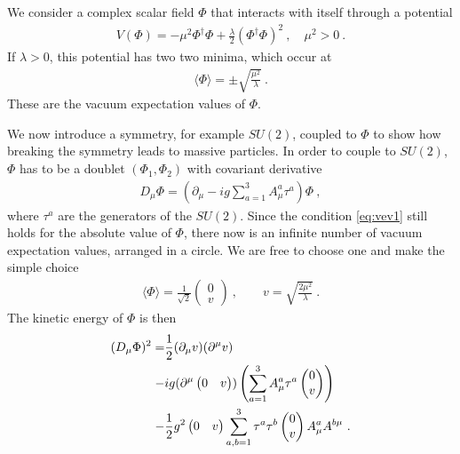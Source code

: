 We consider a complex scalar field $\Phi$ that interacts with itself through a potential
\begin{align}
	V(\Phi) = -\mu^2\Phi^\dagger\Phi + \frac{\lambda}{2}(\Phi^\dagger\Phi)^2 \ , \quad \mu^2 > 0 \ .
\end{align}
If $\lambda>0$, this potential has two two minima, which occur at
\begin{align}\label{eq:vev1}
	\langle\Phi\rangle =  \pm\sqrt{\frac{\mu^2}{\lambda}} \ .
\end{align}
These are the vacuum expectation values of $\Phi$.

We now introduce a symmetry, for example $SU(2)$, coupled to $\Phi$ to show how breaking the symmetry leads to massive particles. In order to couple to $SU(2)$, $\Phi$ has to be a doublet $(\Phi_1,\Phi_2)$ with covariant derivative
\begin{align}
	D_\mu\Phi = (\partial_\mu - ig\sum_{a=1}^3A_\mu^a\tau^a)\Phi \ ,
\end{align}
where $\tau^a$ are the generators of the $SU(2)$. Since the condition \ref{eq:vev1} still holds for the absolute value of $\Phi$, there now is an infinite number of vacuum expectation values, arranged in a circle. We are free to choose one and make the simple choice
\begin{align}\label{eq:vev2}
	\langle\Phi\rangle = \frac{1}{\sqrt{2}}\begin{pmatrix} 0 \\ v \end{pmatrix} \ , \qquad v = \sqrt{\frac{2\mu^2}{\lambda}} \ .
\end{align}
The kinetic energy of $\Phi$ is then
\begin{align}\label{eq:Ekin}
	(D_\mu\Phi)^2 = &\frac{1}{2}(\partial_\mu v)(\partial^\mu v)\notag \\
	- &ig(\partial^\mu\begin{pmatrix} 0 & v \end{pmatrix}) \left(\sum_{a=1}^3A_\mu^a\tau^a\begin{pmatrix} 0 \\ v \end{pmatrix}\right)\notag \\
	- &\frac{1}{2}g^2\begin{pmatrix} 0 & v \end{pmatrix}\sum_{a,b=1}^{3}\tau^a\tau^b\begin{pmatrix} 0 \\ v \end{pmatrix}A_\mu^aA^{b\mu} \ .
\end{align}
